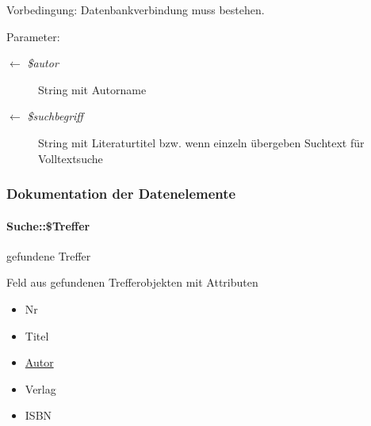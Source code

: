 \begin{Desc}
\item[Vorbedingung:]Datenbankverbindung muss bestehen. \end{Desc}
\begin{Desc}
\item[Parameter:]
\begin{description}
\item[\mbox{$\leftarrow$} {\em \$autor}]String mit Autorname \item[\mbox{$\leftarrow$} {\em \$suchbegriff}]String mit Literaturtitel bzw. wenn einzeln übergeben Suchtext für Volltextsuche \end{description}
\end{Desc}


\subsubsection{Dokumentation der Datenelemente}
\hypertarget{classSuche_0ee0e1ffb3f79392915fd39934d7140d}{
\paragraph[\$Treffer]{\setlength{\rightskip}{0pt plus 5cm}Suche::\$Treffer}\hfill}
\label{classSuche_0ee0e1ffb3f79392915fd39934d7140d}


gefundene Treffer 

Feld aus gefundenen Trefferobjekten mit Attributen\begin{itemize}
\item Nr\item Titel\item \hyperlink{classAutor}{Autor}\item Verlag\item ISBN \end{itemize}
